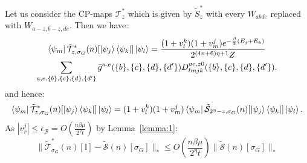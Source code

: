 \documentclass[aps,floatfix,10pt,amssymb,amsfont,amsmath,superscriptaddress,float,nofootinbib,longbibliography,nobalancelastpage,twocolumn]{revtex4-2}
\begin{document}
Let us consider the CP-maps $\mathcal{T}^*_z$ which is given by $\tilde S^*_z$ with every $W_{abde}$ replaced with $W_{a-z,b-z,de}$. Then we have:
\begin{multline}
         \bra{\psi_m}\tilde{\mathcal{T}}^*_{z,\sigma_G}(n)[\ket{\psi_j}\bra{\psi_k}]\ket{\psi_l} = \frac{(1+v_l^k)(1+v_m^j)e^{-\frac{\beta}{2}(E_j+E_k)}}{2^{(4n+6)\eta+1}Z}\\\sum_{a,e,\{b\},\{c\},\{d\},\{d'\}} \bar g^{a,e}(\{b\},\{c\},\{d\},\{d'\}) D^{ae,z0}_{lmjk}(\{b\},\{c\},\{d\},\{d'\}).
     \label{eq:relabelline-symmetrized}
\end{multline}
and hence:
\begin{equation}
    \bra{\psi_m}\tilde{\mathcal{T}}^*_{z,\sigma_G}(n)[\ket{\psi_j}\bra{\psi_k}]\ket{\psi_l}
    =(1+v_l^k)(1+v_m^j)\bra{\psi_m}\tilde{\mathcal{S}}_{2^{\eta}-z,\sigma_G}(n)[\ket{\psi_j}\bra{\psi_k}]\ket{\psi_l}.
\end{equation}
As $|v_r^j| \leq \epsilon_{\mathcal{B}} = O(\frac{n\beta \mu}{2^{\eta}t})$ by Lemma~\ref{lemma:1}:
\begin{equation}
    \|\tilde{\mathcal{T}}^*_{\sigma_G}(n)[\mathbb{I}] - \tilde{\mathcal{S}}(n)[\sigma_G]\|_* \leq O\left(\frac{n\beta \mu}{2^{\eta}t}\right)\|\tilde{\mathcal{S}}(n)[\sigma_G]\|_*
    \label{eq:Boutput}
\end{equation}
\end{document}
